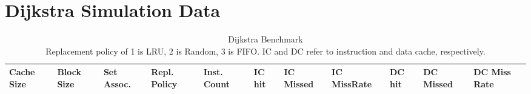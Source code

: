 \documentclass[conference]{IEEEtran}
\begin{document}
\section{Dijkstra Simulation Data}
    \begin{table}
      \caption{Dijkstra Benchmark\\ Replacement policy of 1 is LRU, 2 is Random, 3 is FIFO. IC and DC refer to instruction and data cache, respectively.}
      \centering
        \begin{tabular}{|m{.75cm} |m{.75cm} |m{.8cm} | m{.75cm} | l | l | l | l | l | l | l |}
          \hline
          \textbf{Cache Size} & \textbf{ Block Size} & \textbf{Set Assoc.} & \textbf{Repl. Policy} & \textbf{Inst. Count} & \textbf{IC hit} & \textbf{IC Missed} & \textbf{IC MissRate} & \textbf{DC hit} & \textbf{DC Missed} & \textbf{DC Miss Rate} \\ \hline
          

\end{tabular}
\end{table}
\end{document}
